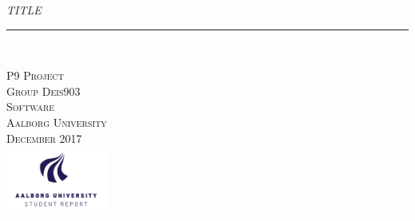 \thispagestyle{empty}
\begin{flushright}
\vspace{3cm}

\phantom{hul}

\phantom{hul}

\phantom{hul}

\textsl{\Huge TITLE} \\ \vspace{1cm}

\rule{13cm}{3mm} \\ %
\end{flushright}

\begin{flushright}
\vspace{2cm}
\textsc{\Large P9 Project \\
Group Deis903 \\
Software\\
Aalborg University\\
 December 2017\\
\includegraphics[width=0.25\textwidth]{graphics/AAU-logo-stud-UK-RGB.pdf}}
\end{flushright}
